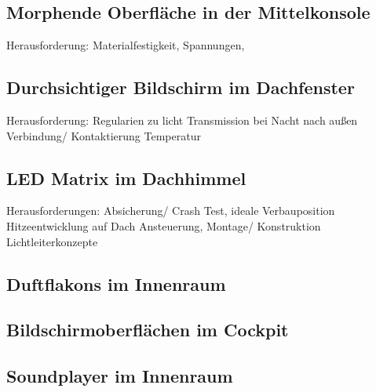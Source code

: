 \subsection{Morphende Oberfläche in der Mittelkonsole}
Herausforderung:
Materialfestigkeit, Spannungen,

\subsection{Durchsichtiger Bildschirm im Dachfenster}
Herausforderung:
Regularien zu licht Transmission bei Nacht nach außen
Verbindung/ Kontaktierung
Temperatur
\subsection{LED Matrix im Dachhimmel}
Herausforderungen:
Absicherung/ Crash Test, ideale Verbauposition
Hitzeentwicklung auf Dach
Ansteuerung, Montage/ Konstruktion
Lichtleiterkonzepte
\subsection{Duftflakons im Innenraum}
\subsection{Bildschirmoberflächen im Cockpit}
\subsection{Soundplayer im Innenraum}
